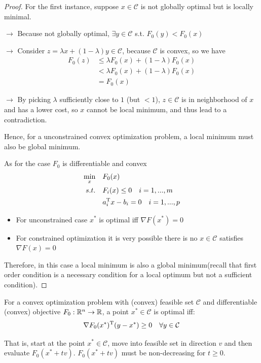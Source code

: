 \begin{proof}
    
    For the first instance, suppose $x\in \mathcal{C}$ is not globally optimal but is locally minimal.
	
	$\rightarrow$ Because not globally optimal, $\exists y\in \mathcal{C}$ s.t. $F_0(y)<F_0(x)$
	
	$\rightarrow$ Consider $z = \lambda x + (1-\lambda)y\in \mathcal{C}$, because $\mathcal{C}$ is convex, so we have
	\begin{align*}
	F_0(z) &\leq \lambda F_0(x) + (1-\lambda)F_0(x)\\
	&< \lambda F_0(x) + (1-\lambda)F_0(x)\\
	&= F_0(x)
	\end{align*}
	
	$\rightarrow$ By picking $\lambda$ sufficiently close to $1$ (but $< 1$), $z\in \mathcal{C}$ is in neighborhood of $x$ and has a lower cost, so $x$ cannot be local minimum, and thus lead to a contradiction.
	
	Hence, for a unconstrained convex optimization problem, a local minimum must also be global minimum.
	
	As for the case $F_0$ is differentiable and convex
	\begin{align*}
	\min_x\quad & F_0(x) \\
	s.t.\quad & F_i(x) \leq 0 \quad i = 1,...,m\\
	& a_i^{{\rm T}}x - b_i = 0\quad i = 1,...,p
	\end{align*}

	\begin{itemize}
	\item For unconstrained case $x^*$ is optimal iff $\nabla F(x^*) = 0$
	
	\item For constrained optimization it is very possible there is no $x\in \mathcal{C}$ satisfies $\nabla F(x) = 0$
	\end{itemize}

	Therefore, in this case a local minimum is also a global minimum(recall that first order condition is a necessary condition for a local optimum but not a sufficient condition).
	\end{proof}



\begin{theorem}
	For a convex optimization problem with (convex) feasible set $\mathcal{C}$ and differentiable (convex) objective $F_0: \mathbb{R}^n \rightarrow \mathbb{R}$, a point $x^* \in \mathcal{C}$ is optimal iff:
	\begin{equation*}
	\nabla F_0(x^*)^{{\rm T}}(y - x^*) \geq 0  \quad \forall y \in \mathcal{C}
	\end{equation*}

That is, start at the point $x^*\in \mathcal{C}$, move into feasible set in direction $v$ and then evaluate $F_0(x^*+tv)$. $F_0(x^*+tv)$ must be non-decreasing for $t\geq 0$.
\end{theorem}

